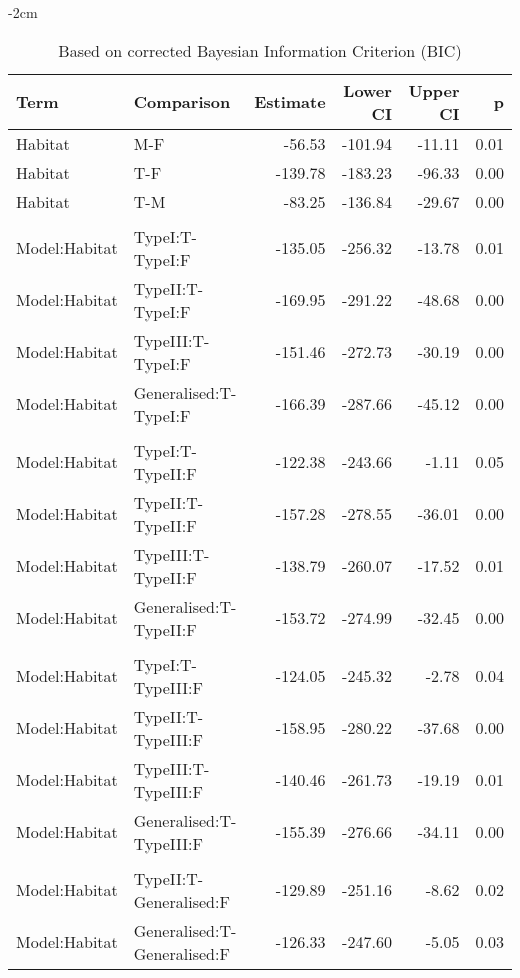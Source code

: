 \documentclass[11pt]{article}
\begin{document}
\begin{table}[htpb]
\begin{subtable}{1\textwidth}
    \centering
    \addtolength{\leftskip} {-2cm}
    \addtolength{\rightskip}{-2cm}
        \caption{Based on corrected Bayesian Information Criterion (BIC)}\label{tab:sub_first}
\begin{tabular}{llrrrr}
    \toprule
   {\textbf{Term}} & {\textbf{Comparison}} & {\textbf{Estimate}} & {\textbf{Lower CI}} & {\textbf{Upper CI}} & {\textbf{p}} \\ 
    \midrule
  Habitat & M-F & -56.53 & -101.94 & -11.11 & 0.01 \\ 
  Habitat & T-F & -139.78 & -183.23 & -96.33 & 0.00 \\ 
  Habitat & T-M & -83.25 & -136.84 & -29.67 & 0.00 \\ 
  \\
  Model:Habitat & TypeI:T-TypeI:F & -135.05 & -256.32 & -13.78 & 0.01 \\ 
  Model:Habitat & TypeII:T-TypeI:F & -169.95 & -291.22 & -48.68 & 0.00 \\ 
  Model:Habitat & TypeIII:T-TypeI:F & -151.46 & -272.73 & -30.19 & 0.00 \\ 
  Model:Habitat & Generalised:T-TypeI:F & -166.39 & -287.66 & -45.12 & 0.00 \\ 
  \\
  Model:Habitat & TypeI:T-TypeII:F & -122.38 & -243.66 & -1.11 & 0.05 \\ 
  Model:Habitat & TypeII:T-TypeII:F & -157.28 & -278.55 & -36.01 & 0.00 \\ 
  Model:Habitat & TypeIII:T-TypeII:F & -138.79 & -260.07 & -17.52 & 0.01 \\ 
  Model:Habitat & Generalised:T-TypeII:F & -153.72 & -274.99 & -32.45 & 0.00 \\ 
  \\
  Model:Habitat & TypeI:T-TypeIII:F & -124.05 & -245.32 & -2.78 & 0.04 \\ 
  Model:Habitat & TypeII:T-TypeIII:F & -158.95 & -280.22 & -37.68 & 0.00 \\ 
  Model:Habitat & TypeIII:T-TypeIII:F & -140.46 & -261.73 & -19.19 & 0.01 \\ 
  Model:Habitat & Generalised:T-TypeIII:F & -155.39 & -276.66 & -34.11 & 0.00 \\ 
  \\
  Model:Habitat & TypeII:T-Generalised:F & -129.89 & -251.16 & -8.62 & 0.02 \\ 
  Model:Habitat & Generalised:T-Generalised:F & -126.33 & -247.60 & -5.05 & 0.03 \\ 
     \bottomrule
  \end{tabular}
\end{subtable}

\end{table}
\end{document}
